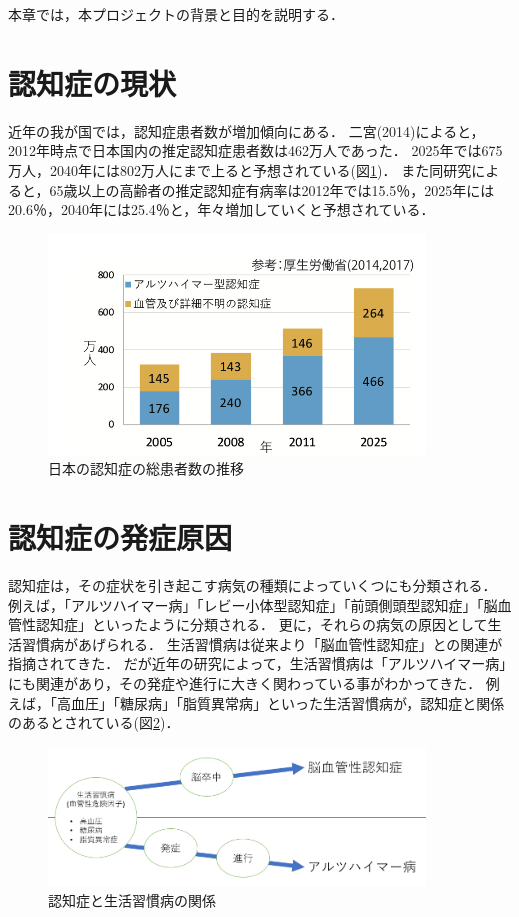 \documentclass[../report]{subfiles}
\begin{document}
本章では，本プロジェクトの背景と目的を説明する．


\section{認知症の現状}
近年の我が国では，認知症患者数が増加傾向にある．
二宮(2014)によると，2012年時点で日本国内の推定認知症患者数は462万人であった\cite{syourai}．
2025年では675万人，2040年には802万人にまで上ると予想されている(図\ref{fig:ninchisyo-graph})．
また同研究によると，65歳以上の高齢者の推定認知症有病率は2012年では15.5％，2025年には20.6％，2040年には25.4％と，年々増加していくと予想されている\cite{syourai}．
\begin{figure}[htbp]
    \begin{center}
        \includegraphics[width=10cm]{imgs/ninchisyo-graph.png}
        \caption{日本の認知症の総患者数の推移}
        \label{fig:ninchisyo-graph}
    \end{center}
\end{figure}


\section{認知症の発症原因} \label{sec:cause}
認知症は，その症状を引き起こす病気の種類によっていくつにも分類される．
例えば，「アルツハイマー病」「レビー小体型認知症」「前頭側頭型認知症」「脳血管性認知症」といったように分類される．
更に，それらの病気の原因として生活習慣病があげられる．
生活習慣病は従来より「脳血管性認知症」との関連が指摘されてきた．
だが近年の研究によって，生活習慣病は「アルツハイマー病」にも関連があり，その発症や進行に大きく関わっている事がわかってきた\cite{seikatsu}．
例えば，「高血圧」「糖尿病」「脂質異常病」といった生活習慣病が，認知症と関係のあるとされている(図\ref{fig:relation-dementia-life-habit})．
\begin{figure}[htbp]
    \begin{center}
        \includegraphics[width=10cm]{imgs/relation-dementia-life-habit.png}
        \caption{認知症と生活習慣病の関係}
        \label{fig:relation-dementia-life-habit}
    \end{center}
\end{figure}
\end{document}
